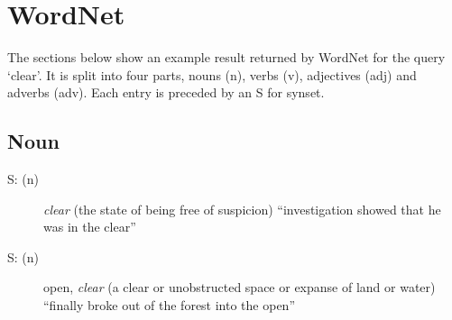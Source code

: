 
\chapter{WordNet}
\label{app:wordnet}


The sections below show an example result returned by WordNet for the query `clear'. It is split into four parts, nouns (n), verbs (v), adjectives (adj) and adverbs (adv). Each entry is preceded by an S for synset.


\section{Noun}
\begin{description}
  \item [S: (n)] \emph{clear} (the state of being free of suspicion) ``investigation showed that he was in the clear''
  \item [S: (n)] open, \emph{clear} (a clear or unobstructed space or expanse of land or water) ``finally broke out of the forest into the open''
\end{description}


